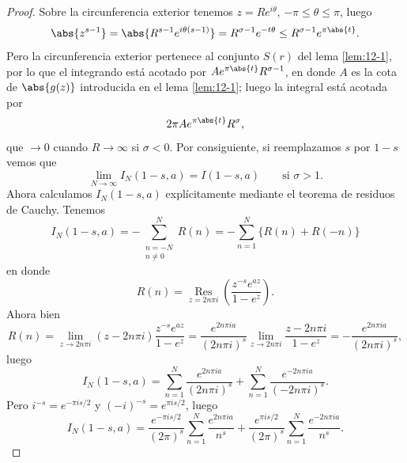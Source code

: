 \documentclass[12pt,a4paper]{book}
\begin{document}
\begin{proof}
        Sobre la circunferencia exterior tenemos $z=Re^{i\theta}$, $-\pi\leq\theta\leq\pi$,
        luego
        \begin{equation*}
            \abs{z^{s-1}}=\abs{R^{s-1}e^{i\theta(s-1)}}=R^{\sigma-1}e^{-t\theta}\leq R^{\sigma-1}e^{\pi\abs{t}}.
        \end{equation*}
        Pero la circunferencia exterior pertenece al conjunto $S(r)$ del lema \ref{lem:12-1},
        por lo que el integrando está acotado por $Ae^{\pi\abs{t}}R^{\sigma-1}$, en donde $A$
        es la cota de $\abs{g(z)}$ introducida en el lema \ref{lem:12-1}; luego la integral
        está acotada por
        \begin{equation*}
            2\pi Ae^{\pi\abs{t}}R^{\sigma},
        \end{equation*}
        que $\to0$ cuando $R\to\infty$ si $\sigma<0$. Por consiguiente, si reemplazamos $s$ por
        $1-s$ vemos que
        \begin{equation}\label{eq:12-11}
            \lim_{N\to\infty}I_{N}(1-s,a)=I(1-s,a)\qquad\text{si }\sigma>1.
        \end{equation}
        Ahora calculamos $I_{N}(1-s,a)$ explícitamente mediante el teorema de residuos de
        Cauchy. Tenemos
        \begin{equation*}
            I_{N}(1-s,a)=-\sum_{\substack{n=-N\\n\neq0}}^{N}R(n)=-\sum_{n=1}^{N}\{R(n)+R(-n)\}
        \end{equation*}
        en donde
        \begin{equation*}
            R(n)=\operatorname*{Res}_{z=2n\pi i}\left(\frac{z^{-s}e^{az}}{1-e^{z}}\right).
        \end{equation*}
        Ahora bien
        \begin{equation*}
            R(n)=\lim_{z\to2n\pi i}(z-2n\pi i)\frac{z^{-s}e^{az}}{1-e^{z}}=\frac{e^{2n\pi ia}}{(2n\pi i)^{s}}\lim_{z\to2n\pi i}\frac{z-2n\pi i}{1-e^{z}}=-\frac{e^{2n\pi ia}}{(2n\pi i)^{s}},
        \end{equation*}
        luego
        \begin{equation*}
            I_{N}(1-s,a)=\sum_{n=1}^{N}\frac{e^{2n\pi ia}}{(2n\pi i)^{s}}+\sum_{n=1}^{N}\frac{e^{-2n\pi ia}}{(-2n\pi i)^{s}}.
        \end{equation*}
        Pero $i^{-s}=e^{-\pi is/2}$ y $(-i)^{-s}=e^{\pi is/2}$, luego
        \begin{equation*}
            I_{N}(1-s,a)=\frac{e^{-\pi is/2}}{(2\pi)^{s}}\sum_{n=1}^{N}\frac{e^{2n\pi ia}}{n^{s}}+\frac{e^{\pi is/2}}{(2\pi)^{s}}\sum_{n=1}^{N}\frac{e^{-2n\pi ia}}{n^{s}}.

\end{equation*}
\end{proof}
\end{document}

